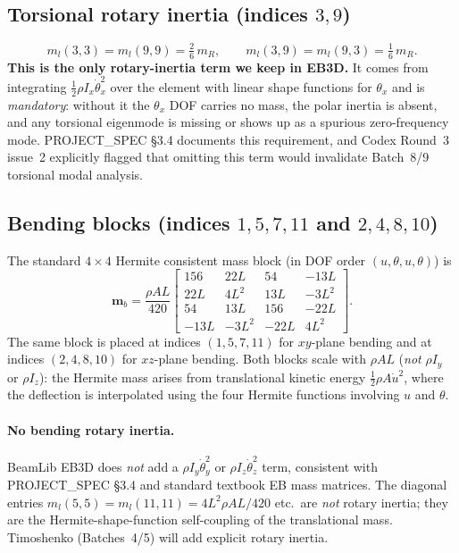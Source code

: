 \documentclass[11pt,a4paper]{article}
\newcommand{\bmath}[1]{\boldsymbol{#1}}
\begin{document}
\subsection{Torsional rotary inertia (indices $3, 9$)}
\[
m_l(3,3) = m_l(9,9) = \tfrac{2}{6}\,m_R, \qquad m_l(3,9) = m_l(9,3) = \tfrac{1}{6}\,m_R.
\]
\textbf{This is the only rotary-inertia term we keep in EB3D.} It comes from integrating $\tfrac{1}{2}\rho I_x \dot\theta_x^2$ over the element with linear shape functions for $\theta_x$ and is \emph{mandatory}: without it the $\theta_x$ DOF carries no mass, the polar inertia is absent, and any torsional eigenmode is missing or shows up as a spurious zero-frequency mode. PROJECT\_SPEC \S3.4 documents this requirement, and Codex Round~3 issue~2 explicitly flagged that omitting this term would invalidate Batch~8/9 torsional modal analysis.

\subsection{Bending blocks (indices $1, 5, 7, 11$ and $2, 4, 8, 10$)}

The standard $4\times 4$ Hermite consistent mass block (in DOF order $(u, \theta, u, \theta)$) is
\[
\bmath{m}_b = \frac{\rho A L}{420}\begin{bmatrix}
156 & 22L & 54 & -13L \\
22L & 4L^2 & 13L & -3L^2 \\
54  & 13L & 156 & -22L \\
-13L & -3L^2 & -22L & 4L^2
\end{bmatrix}.
\]
The same block is placed at indices $(1, 5, 7, 11)$ for $xy$-plane bending and at indices $(2, 4, 8, 10)$ for $xz$-plane bending. Both blocks scale with $\rho A L$ (\emph{not} $\rho I_y$ or $\rho I_z$): the Hermite mass arises from translational kinetic energy $\tfrac{1}{2}\rho A \dot u^2$, where the deflection is interpolated using the four Hermite functions involving $u$ and $\theta$.

\paragraph{No bending rotary inertia.} BeamLib EB3D does \emph{not} add a $\rho I_y \dot\theta_y^2$ or $\rho I_z \dot\theta_z^2$ term, consistent with PROJECT\_SPEC \S3.4 and standard textbook EB mass matrices. The diagonal entries $m_l(5,5) = m_l(11,11) = 4 L^2 \rho A L / 420$ etc.\ are \emph{not} rotary inertia; they are the Hermite-shape-function self-coupling of the translational mass. Timoshenko (Batches~4/5) will add explicit rotary inertia.
\end{document}
